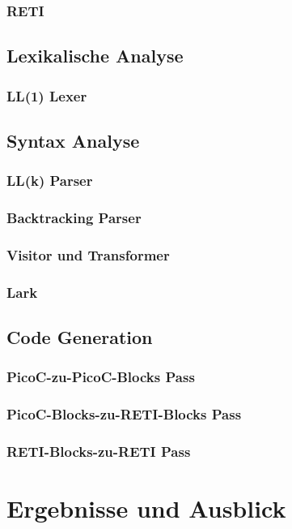 \documentclass{scrreprt}
\begin{document}
  \subsection{RETI}
  \section{Lexikalische Analyse}
  \subsection{LL(1) Lexer}
  \section{Syntax Analyse}
  \subsection{LL(k) Parser}
  \subsection{Backtracking Parser}
  \subsection{Visitor und Transformer}
  \subsection{Lark}
  \section{Code Generation}
  \subsection{PicoC-zu-PicoC-Blocks Pass}
  \subsection{PicoC-Blocks-zu-RETI-Blocks Pass}
  \subsection{RETI-Blocks-zu-RETI Pass}
  \chapter{Ergebnisse und Ausblick}
  \lipsum
\end{document}
